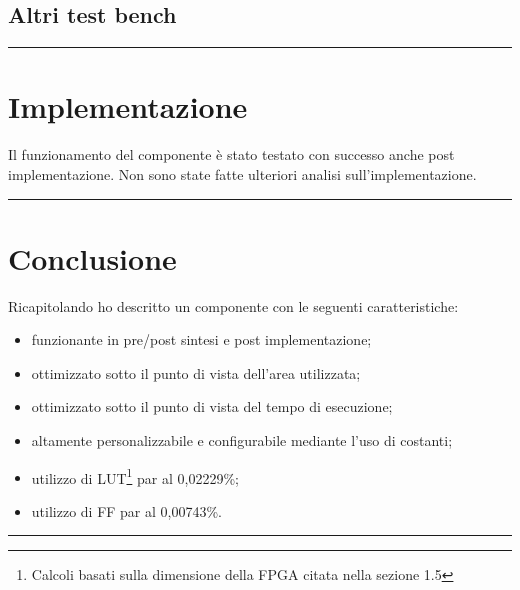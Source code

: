 \documentclass{article}
\begin{document}
\subsection{Altri test bench}

\noindent\rule{\textwidth}{0.5pt}
\newpage
\section{Implementazione}
Il funzionamento del componente è stato testato con successo anche post implementazione. Non sono state fatte ulteriori analisi sull'implementazione.

\noindent\rule{\textwidth}{0.5pt}
\newpage
\section{Conclusione}
Ricapitolando ho descritto un componente con le seguenti caratteristiche:
\begin{itemize}
	\item funzionante in pre/post sintesi e post implementazione;
	\item ottimizzato sotto il punto di vista dell'area utilizzata;
	\item ottimizzato sotto il punto di vista del tempo di esecuzione;
	\item altamente personalizzabile e configurabile mediante l'uso di costanti;
	\item utilizzo di LUT\footnote{Calcoli basati sulla dimensione della FPGA citata nella sezione 1.5\label{fn}}  par al 0,02229\%;
	\item utilizzo di FF par al 0,00743\%.
\end{itemize}

\noindent\rule{\textwidth}{0.5pt}
\end{document}
